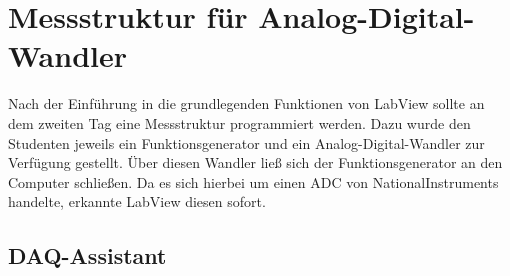 \section{Messstruktur für Analog-Digital-Wandler}
	
	Nach der Einführung in die grundlegenden Funktionen von LabView sollte an dem zweiten Tag eine Messstruktur programmiert werden.
	Dazu wurde den Studenten jeweils ein Funktionsgenerator und ein Analog-Digital-Wandler zur Verfügung gestellt.
	Über diesen Wandler ließ sich der Funktionsgenerator an den Computer schließen.
	Da es sich hierbei um einen ADC von NationalInstruments handelte, erkannte LabView diesen sofort.
	
	\subsection{DAQ-Assistant}
	
